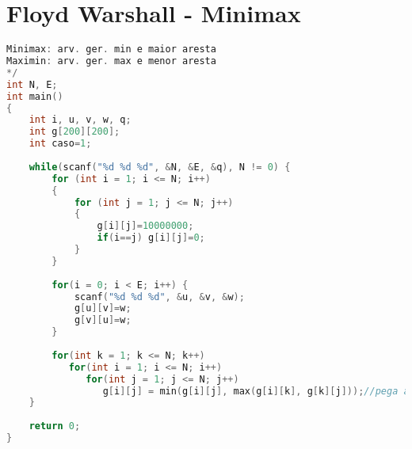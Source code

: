 \documentclass[12pt,a4paper,twoside]{report}
\begin{document}
\section{Floyd Warshall - Minimax}
\noindent\begin{lstlisting}[caption=Floyd Warshall - Minimax,language=C++]
Minimax: arv. ger. min e maior aresta
Maximin: arv. ger. max e menor aresta
*/
int N, E;
int main()
{
    int i, u, v, w, q;
    int g[200][200];
    int caso=1;
 
    while(scanf("%d %d %d", &N, &E, &q), N != 0) { 
        for (int i = 1; i <= N; i++)
        {
            for (int j = 1; j <= N; j++)
            {
                g[i][j]=10000000;
                if(i==j) g[i][j]=0;
            }         
        }
 
        for(i = 0; i < E; i++) {
            scanf("%d %d %d", &u, &v, &w);
            g[u][v]=w;
            g[v][u]=w;
        }
         
        for(int k = 1; k <= N; k++)
           for(int i = 1; i <= N; i++)
              for(int j = 1; j <= N; j++)
                 g[i][j] = min(g[i][j], max(g[i][k], g[k][j]));//pega a maior aresta do caminho (so existe um caminho, é uma arvore)      
    }
 
    return 0;
}
\end{lstlisting}
\end{document}
